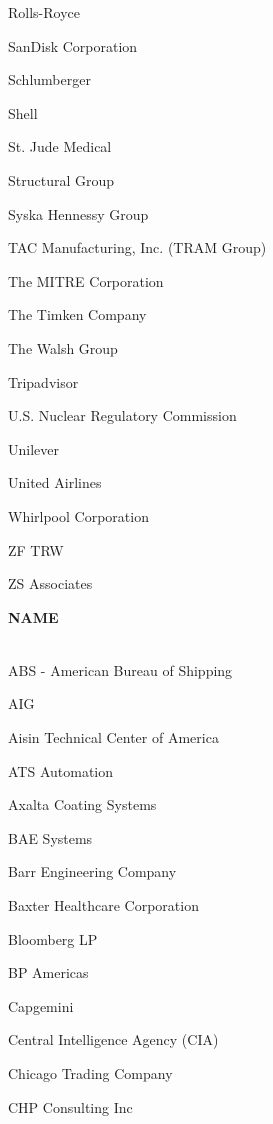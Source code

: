 \documentclass[twoside]{article}
\begin{document}
\begin{center}
\begin{multicols}{5}
\begin{FlushLeft}
\begin{compactitem}
\item Rolls-Royce
\item SanDisk Corporation
\item Schlumberger
\item Shell
\item St. Jude Medical
\item Structural Group
\item Syska Hennessy Group
\item TAC Manufacturing, Inc. (TRAM Group)
\item The MITRE Corporation
\item The Timken Company
\item The Walsh Group
\item Tripadvisor
\item U.S. Nuclear Regulatory Commission
\item Unilever
\item United Airlines
\item Whirlpool Corporation
\item ZF TRW
\item ZS Associates
\end{compactitem}
        \end{FlushLeft}
        \vspace{1em}
        {\fontsize{14}{16}\selectfont \bf NAME}\\
        \vspace{-1em}
        ~\hrulefill~
        \vspace{-.9em}
        \begin{FlushLeft}
        \begin{compactitem}
        \item ABS - American Bureau of Shipping
\item AIG
\item Aisin Technical Center of America
\item ATS Automation
\item Axalta Coating Systems
\item BAE Systems
\item Barr Engineering Company
\item Baxter Healthcare Corporation
\item Bloomberg LP
\item BP Americas
\item Capgemini
\item Central Intelligence Agency (CIA)
\item Chicago Trading Company
\item CHP Consulting Inc

\end{compactitem}
\end{FlushLeft}
\end{multicols}
\end{center}
\end{document}
